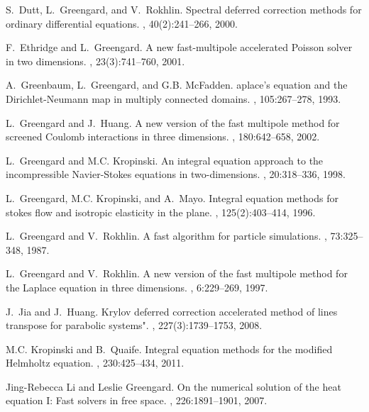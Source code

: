 \documentclass[preprint,12pt]{elsarticle}
\begin{document}
\begin{thebibliography}{10}
S.~Dutt, L.~Greengard, and V.~Rokhlin.
\newblock Spectral deferred correction methods for ordinary differential equations.
, 40(2):241--266, 2000.

F.~Ethridge and L.~Greengard.
\newblock A new fast-multipole accelerated Poisson solver in two dimensions.
, 23(3):741--760, 2001.

A.~Greenbaum, L.~Greengard, and G.B. McFadden.
aplace's equation and the Dirichlet-Neumann map in multiply
  connected domains.
, 105:267--278, 1993.

L.~Greengard and J.~Huang.
\newblock A new version of the fast multipole method for screened Coulomb
  interactions in three dimensions.
, 180:642--658, 2002.

L.~Greengard and M.C. Kropinski.
\newblock An integral equation approach to the incompressible {N}avier-{S}tokes
  equations in two-dimensions.
, 20:318--336, 1998.

L.~Greengard, M.C. Kropinski, and A.~Mayo.
\newblock Integral equation methods for stokes flow and isotropic elasticity in
  the plane.
, 125(2):403--414, 1996.

L.~Greengard and V.~Rokhlin.
\newblock A fast algorithm for particle simulations.
, 73:325--348, 1987.

L.~Greengard and V.~Rokhlin.
\newblock A new version of the fast multipole method for the {L}aplace equation
  in three dimensions.
, 6:229--269, 1997.

J.~Jia and J.~Huang.
\newblock Krylov deferred correction accelerated method of lines transpose for parabolic systems".
, 227(3):1739--1753, 2008.

M.C. Kropinski and B.~Quaife.
\newblock Integral equation methods for the modified Helmholtz equation.
, 230:425--434, 2011.

Jing-Rebecca Li and Leslie Greengard.
\newblock On the numerical solution of the heat equation {I}: Fast solvers in
  free space.
, 226:1891--1901, 2007.


\end{thebibliography}
\end{document}
